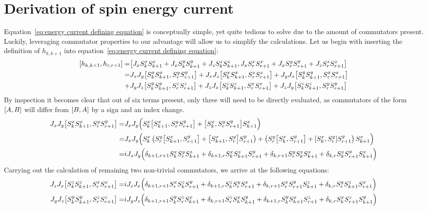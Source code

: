 \chapter{Derivation of spin energy current\label{app:spin energy current derivation}}
\thispagestyle{chapterBeginStyle}

Equation~\eqref{eq:energy current defining equation} is
conceptually simple, yet quite tedious to solve due to the amount of commutators present. Luckily, leveraging commutator properties
to our advantage will allow us to simplify the calculations. Let us begin with inserting the definition of \(h_{k,k+1}\) into 
equation~\eqref{eq:energy current defining equation}:
\begin{align*}
    \comm{h_{k,k+1}}{h_{r,r+1}} =& \comm{J_{x} \Sx_{k}\Sx_{k+1} + J_{x} \Sy_{k}\Sy_{k+1} + J_{z} \Sz_{k}\Sz_{k+1}}{J_{x} \Sx_{r}\Sx_{r+1} + J_{x} \Sy_{r}\Sy_{r+1} + J_{z} \Sz_{r}\Sz_{r+1}}\\
    =& J_{x} J_{y}\comm{\Sx_{k}\Sx_{k+1}}{\Sy_{r}\Sy_{r+1}} + J_{x} J_{z}\comm{\Sx_{k}\Sx_{k+1}}{\Sz_{r}\Sz_{r+1}} + J_{y} J_{x}\comm{\Sy_{k}\Sy_{k+1}}{\Sx_{r}\Sx_{r+1}}\\
    +& J_{y} J_{z}\comm{\Sy_{k}\Sy_{k+1}}{\Sz_{r}\Sz_{r+1}} + J_{z} J_{x}\comm{\Sz_{k}\Sz_{k+1}}{\Sx_{r}\Sx_{r+1}} + J_{z} J_{y}\comm{\Sz_{k}\Sz_{k+1}}{\Sy_{r}\Sy_{r+1}}  
\end{align*}
By inspection it becomes clear that out of six terms present, only three will need to be directly evaluated, as commutators of the form
\(\comm{A}{B}\) will differ from \(\comm{B}{A}\) by a sign and an index change.
\begin{align*}
    J_{x} J_{y}\comm{\Sx_{k}\Sx_{k+1}}{\Sy_{r}\Sy_{r+1}} =& J_x J_y \Big(\Sx_k\comm{\Sx_{k+1}}{\Sy_{r}\Sy_{r+1}} + \comm{\Sx_{k}}{\Sy_{r}\Sy_{r+1}} \Sx_{k+1} \Big)\\
    =& J_x J_y \Big( \Sx_k \left( \Sy_r \comm{\Sx_{k+1}}{\Sy_{r+1}} + \comm{\Sx_{k+1}}{\Sy_{r}} \Sy_{r+1}\right) + 
    \left( \Sy_r \comm{\Sx_{k}}{\Sy_{r+1}} + \comm{\Sx_{k}}{\Sy_{r}} \Sy_{r+1} \right)\Sx_{k+1} \Big)\\
    =& i J_x J_y \Big( \delta_{k+1,r+1} \Sx_k \Sy_r \Sz_{k+1} + \delta_{k+1,r} \Sx_k \Sz_{k+1} \Sy_{r+1} + \delta_{k,r+1} \Sy_r \Sz_k \Sx_{k+1} +\delta_{k,r} \Sz_k \Sy_{r+1} \Sx_{k+1}\Big)
\end{align*}
Carrying out the calculation of remaining two non-trivial commutators, we arrive at the following equations:
\begin{align*}
    J_{z} J_{x}\comm{\Sz_{k}\Sz_{k+1}}{\Sx_{r}\Sx_{r+1}} =& i J_z J_x \Big( \delta_{k+1,r+1} \Sx_r \Sz_k \Sy_{r+1} + \delta_{k+1,r} \Sz_k \Sy_{r} \Sx_{r+1} + \delta_{k,r+1} \Sx_r \Sy_{r+1} \Sz_{k+1} +\delta_{k,r} \Sy_r \Sz_{k+1} \Sx_{r+1}\Big)\\ 
    J_{y} J_{z}\comm{\Sy_{k}\Sy_{k+1}}{\Sz_{r}\Sz_{r+1}} =& i J_y J_z \Big( \delta_{k+1,r+1} \Sy_k \Sz_r \Sx_{k+1} + \delta_{k,r+1} \Sz_r \Sx_{k} \Sy_{k+1} + \delta_{k+1,r} \Sy_k \Sx_{k+1} \Sz_{r+1} +\delta_{k,r} \Sx_k \Sz_{r+1} \Sy_{k+1}\Big) 
\end{align*}
